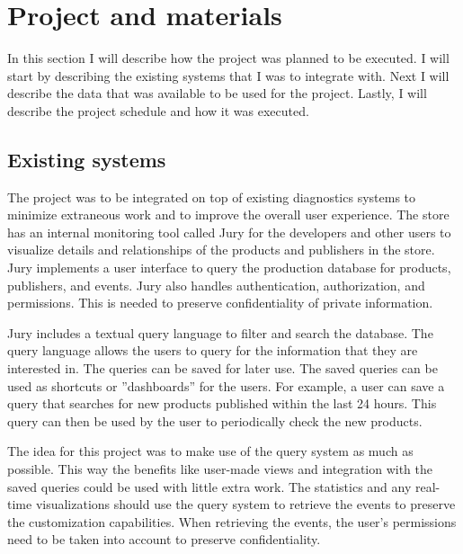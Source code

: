 
\clearpage
\section{Project and materials}
\label{sec:materials}

In this section I will describe how the project was planned to be executed.
I will start by describing the existing systems that I was to integrate with.
Next I will describe the data that was available to be used for the project. 
Lastly, I will describe the project schedule and how it was executed.

\subsection{Existing systems}

The project was to be integrated on top of existing diagnostics systems to minimize extraneous work and to improve the overall user experience.
The store has an internal monitoring tool called Jury for the developers and other users to visualize details and relationships of the products and publishers in the store.
Jury implements a user interface to query the production database for products, publishers, and events.
Jury also handles authentication, authorization, and permissions.
This is needed to preserve confidentiality of private information.

Jury includes a textual query language to filter and search the database.
The query language allows the users to query for the information that they are interested in.
The queries can be saved for later use. 
The saved queries can be used as shortcuts or ''dashboards'' for the users.
For example, a user can save a query that searches for new products published within the last 24 hours.
This query can then be used by the user to periodically check the new products.

The idea for this project was to make use of the query system as much as possible.
This way the benefits like user-made views and integration with the saved queries could be used with little extra work.
The statistics and any real-time visualizations should use the query system to retrieve the events to preserve the customization capabilities.
When retrieving the events, the user's permissions need to be taken into account to preserve confidentiality.

